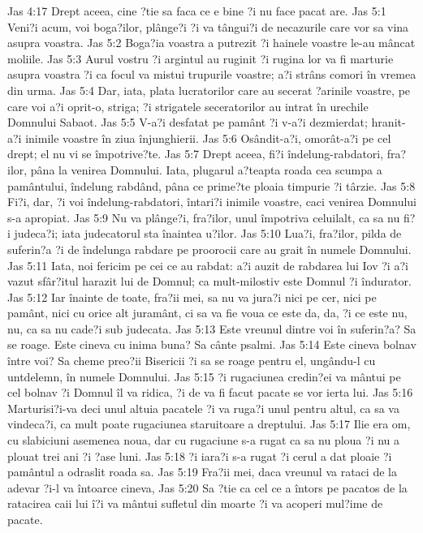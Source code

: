 Jas 4:17  Drept aceea, cine ?tie sa faca ce e bine ?i nu face pacat are.
Jas 5:1  Veni?i acum, voi boga?ilor, plânge?i ?i va tângui?i de necazurile care vor sa vina asupra voastra.
Jas 5:2  Boga?ia voastra a putrezit ?i hainele voastre le-au mâncat moliile.
Jas 5:3  Aurul vostru ?i argintul au ruginit ?i rugina lor va fi marturie asupra voastra ?i ca focul va mistui trupurile voastre; a?i strâns comori în vremea din urma.
Jas 5:4  Dar, iata, plata lucratorilor care au secerat ?arinile voastre, pe care voi a?i oprit-o, striga; ?i strigatele seceratorilor au intrat în urechile Domnului Sabaot.
Jas 5:5  V-a?i desfatat pe pamânt ?i v-a?i dezmierdat; hranit-a?i inimile voastre în ziua înjunghierii.
Jas 5:6  Osândit-a?i, omorât-a?i pe cel drept; el nu vi se împotrive?te.
Jas 5:7  Drept aceea, fi?i îndelung-rabdatori, fra?ilor, pâna la venirea Domnului. Iata, plugarul a?teapta roada cea scumpa a pamântului, îndelung rabdând, pâna ce prime?te ploaia timpurie ?i târzie.
Jas 5:8  Fi?i, dar, ?i voi îndelung-rabdatori, întari?i inimile voastre, caci venirea Domnului s-a apropiat.
Jas 5:9  Nu va plânge?i, fra?ilor, unul împotriva celuilalt, ca sa nu fi?i judeca?i; iata judecatorul sta înaintea u?ilor.
Jas 5:10  Lua?i, fra?ilor, pilda de suferin?a ?i de îndelunga rabdare pe proorocii care au grait în numele Domnului.
Jas 5:11  Iata, noi fericim pe cei ce au rabdat: a?i auzit de rabdarea lui Iov ?i a?i vazut sfâr?itul harazit lui de Domnul; ca mult-milostiv este Domnul ?i îndurator.
Jas 5:12  Iar înainte de toate, fra?ii mei, sa nu va jura?i nici pe cer, nici pe pamânt, nici cu orice alt juramânt, ci sa va fie voua ce este da, da, ?i ce este nu, nu, ca sa nu cade?i sub judecata.
Jas 5:13  Este vreunul dintre voi în suferin?a? Sa se roage. Este cineva cu inima buna? Sa cânte psalmi.
Jas 5:14  Este cineva bolnav între voi? Sa cheme preo?ii Bisericii ?i sa se roage pentru el, ungându-l cu untdelemn, în numele Domnului.
Jas 5:15  ?i rugaciunea credin?ei va mântui pe cel bolnav ?i Domnul îl va ridica, ?i de va fi facut pacate se vor ierta lui.
Jas 5:16  Marturisi?i-va deci unul altuia pacatele ?i va ruga?i unul pentru altul, ca sa va vindeca?i, ca mult poate rugaciunea staruitoare a dreptului.
Jas 5:17  Ilie era om, cu slabiciuni asemenea noua, dar cu rugaciune s-a rugat ca sa nu ploua ?i nu a plouat trei ani ?i ?ase luni.
Jas 5:18  ?i iara?i s-a rugat ?i cerul a dat ploaie ?i pamântul a odraslit roada sa.
Jas 5:19  Fra?ii mei, daca vreunul va rataci de la adevar ?i-l va întoarce cineva,
Jas 5:20  Sa ?tie ca cel ce a întors pe pacatos de la ratacirea caii lui î?i va mântui sufletul din moarte ?i va acoperi mul?ime de pacate.


